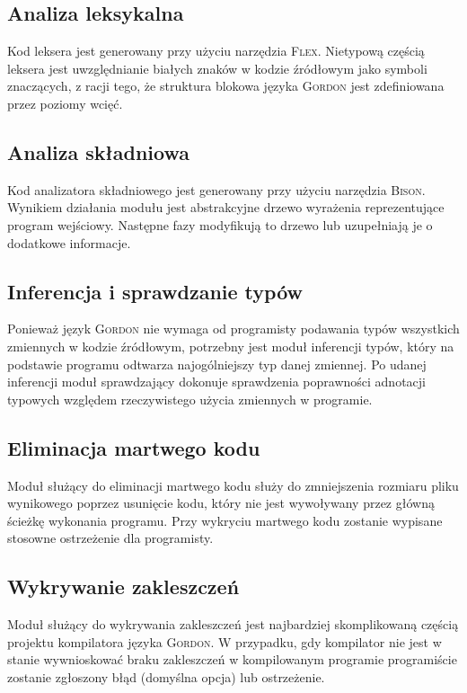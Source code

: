 \documentclass{documentation}
\begin{document}
\subsection{Analiza leksykalna}
\noindent Kod leksera jest generowany przy użyciu narzędzia \textsc{Flex}. Nietypową
częścią leksera jest uwzględnianie białych znaków w kodzie źródłowym jako symboli znaczących,
z racji tego, że struktura blokowa języka \textsc{Gordon} jest zdefiniowana przez poziomy wcięć.

\subsection{Analiza składniowa}
\noindent Kod analizatora składniowego jest generowany przy użyciu narzędzia \textsc{Bison}.
Wynikiem działania modułu jest abstrakcyjne drzewo wyrażenia reprezentujące program wejściowy.
Następne fazy modyfikują to drzewo lub uzupełniają je o dodatkowe informacje.

\subsection{Inferencja i sprawdzanie typów}
\noindent Ponieważ język \textsc{Gordon} nie wymaga od programisty podawania typów wszystkich
zmiennych w kodzie źródłowym, potrzebny jest moduł inferencji typów, który na podstawie
programu odtwarza najogólniejszy typ danej zmiennej. Po udanej inferencji moduł sprawdzający
dokonuje sprawdzenia poprawności adnotacji typowych względem rzeczywistego użycia zmiennych
w programie.

\subsection{Eliminacja martwego kodu}
\noindent Moduł służący do eliminacji martwego kodu służy do zmniejszenia rozmiaru pliku wynikowego
poprzez usunięcie kodu, który nie jest wywoływany przez główną ścieżkę wykonania programu.
Przy wykryciu martwego kodu zostanie wypisane stosowne ostrzeżenie dla programisty.

\subsection{Wykrywanie zakleszczeń}
\noindent Moduł służący do wykrywania zakleszczeń jest najbardziej skomplikowaną częścią projektu
kompilatora języka \textsc{Gordon}. W przypadku, gdy kompilator nie jest w stanie wywnioskować
braku zakleszczeń w kompilowanym programie programiście zostanie zgłoszony błąd (domyślna opcja)
lub ostrzeżenie.
\end{document}
